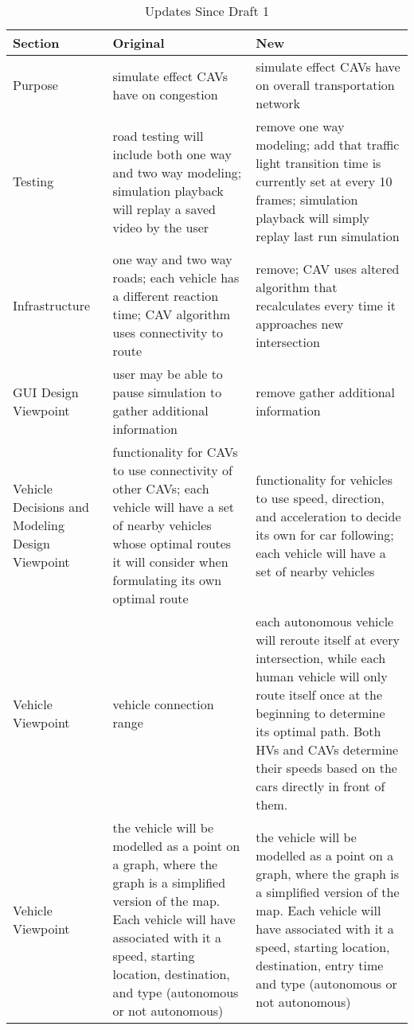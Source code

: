 \documentclass[onecolumn, draftclsnofoot,10pt, compsoc]{IEEEtran}
\begin{document}
\begin{table}[h]
\caption{Updates Since Draft 1}
\begin{tabular}{|p{1in}|p{2.5in}|p{2.5in}|}
\hline
Section                                         & Original  & New \\ \hline
Purpose                                         & simulate effect CAVs have on congestion & simulate effect CAVs have on overall transportation network \\ \hline
Testing                                         & road testing will include both one way and two way modeling; simulation playback will replay a saved video by the user & remove one way modeling; add that traffic light transition time is currently set at every 10 frames; simulation playback will simply replay last run simulation \\ \hline
Infrastructure                                  & one way and two way roads; each vehicle has a different reaction time; CAV algorithm uses connectivity to route & remove; CAV uses altered algorithm that recalculates every time it approaches new intersection \\ \hline
GUI Design Viewpoint                            & user may be able to pause simulation to gather additional information & remove gather additional information \\ \hline
Vehicle Decisions and Modeling Design Viewpoint & functionality for CAVs to use connectivity of other CAVs; each vehicle will have a set of nearby vehicles whose optimal routes it will consider when formulating its own optimal route & functionality for vehicles to use speed, direction, and acceleration to decide its own for car following; each vehicle will have a set of nearby vehicles \\ \hline
Vehicle Viewpoint                               & vehicle connection range & each autonomous vehicle will reroute itself at every intersection, while each human vehicle will only route itself once at the beginning to determine its optimal path. Both HVs and CAVs determine their speeds based on the cars directly in front of them. \\ \hline
Vehicle Viewpoint                               & the vehicle will be modelled as a point on a graph, where the graph is a simplified version of the map. Each vehicle will have associated with it a speed, starting location, destination, and type (autonomous or not autonomous) & the vehicle will be modelled as a point on a graph, where the graph is a simplified version of the map. Each vehicle will have associated with it a speed, starting location, destination, entry time and type (autonomous or not autonomous) \\ \hline

\end{tabular}
\end{table}
\end{document}

